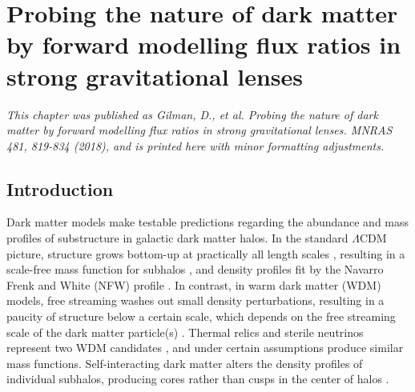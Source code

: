 \def\msub{{\bf{m}_{\rm{sub}}}}
\def\qsub{{\bf{q}_{\rm{sub}}}}
\def\qmac{{\bf{q}_{\rm{mac}}}}
\def\qmacn{{\bf{q}_{\rm{mac(n)}}}}
\def\data{{\bf{d}_{\rm{n}}}}
\def\Data{{\bf{D}}} 
\def\datamod{{\bf{d}_{\rm{n}}^{\ \prime}}}
\def\fobs{{\bf{f_n}}}
\def\fmod{{\bf{f}_{n}^{\ \prime}}}
\def\dlinmod{{\bf{d}_{tx(n)}^{\ \prime}}}
\def\dlin{{\bf{d}_{tx(n)}}}
\def\dlinmlm{{\bf{d}_{tx(n)}^{\ \star}}}
\def\qmacs{{\bf{q}_{\rm{mac(n)}}^{\ \star}}}
\def\fmods{{\bf{f_n}^{\star}}}
\def\msubn{{\bf{m}_{\rm{sub(n)}}}}
\def\qsubi{{\bf{q}_{\rm{sub(i)}}}}
\def\msun{{\rm{M}_{\odot}}}
\def\fobsi{{f_{n\left(i\right)}}}
\def\fmodsi{{f_{n\left(i\right)}^{\ \star}}}
\def\qmacss{{\bf{q}_{\rm{mac(n)}}^{\ \star \star}}}
\def\fmodss{{\bf{f_n}^{\star \star}}}

\chapter{Probing the nature of dark matter by forward modelling flux ratios in strong gravitational lenses}
\textit{This chapter was published as Gilman, D., et al. Probing the nature of dark matter by forward modelling flux ratios in strong gravitational lenses. MNRAS 481, 819-834 (2018), and is printed here with minor formatting adjustments.}

\section{Introduction}
Dark matter models make testable predictions regarding the abundance and mass profiles of substructure in galactic dark matter halos. In the standard $\Lambda$CDM picture, structure grows bottom-up at practically all length scales \citep{Schneider++13}, resulting in a scale-free mass function for subhalos \citep{Springel++08,Gao++11,Fiacconi++16}, and density profiles fit by the Navarro Frenk and White (NFW) profile \citep{Navarro++96}. In contrast, in warm dark matter (WDM) models, free streaming washes out small density perturbations, resulting in a paucity of structure below a certain scale, which depends on the free streaming scale of the dark matter particle(s) \citep{Schneider++12,Pullen++14,Viel13,Lovell++16,Bose++16,Menci++16}. Thermal relics and sterile neutrinos represent two WDM candidates \citep{Kusenko09,Abazajian17}, and under certain assumptions produce similar mass functions. Self-interacting dark matter alters the density profiles of individual subhalos, producing cores rather than cusps in the center of halos \citep{Schneider++16,Vogelsberger++16,Kamada++17}.

